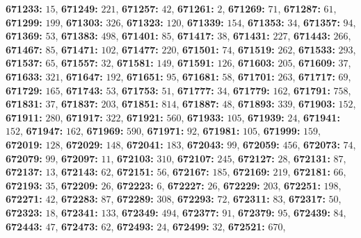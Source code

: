 \textsf{\bfseries 671233:} $15$, \textsf{\bfseries 671249:} $221$, \textsf{\bfseries 671257:} $42$, \textsf{\bfseries 671261:} $2$, \textsf{\bfseries 671269:} $71$, \textsf{\bfseries 671287:} $61$, \textsf{\bfseries 671299:} $199$, \textsf{\bfseries 671303:} $326$, \textsf{\bfseries 671323:} $120$, \textsf{\bfseries 671339:} $154$, \textsf{\bfseries 671353:} $34$, \textsf{\bfseries 671357:} $94$, \textsf{\bfseries 671369:} $53$, \textsf{\bfseries 671383:} $498$, \textsf{\bfseries 671401:} $85$, \textsf{\bfseries 671417:} $38$, \textsf{\bfseries 671431:} $227$, \textsf{\bfseries 671443:} $266$, \textsf{\bfseries 671467:} $85$, \textsf{\bfseries 671471:} $102$, \textsf{\bfseries 671477:} $220$, \textsf{\bfseries 671501:} $74$, \textsf{\bfseries 671519:} $262$, \textsf{\bfseries 671533:} $293$, \textsf{\bfseries 671537:} $65$, \textsf{\bfseries 671557:} $32$, \textsf{\bfseries 671581:} $149$, \textsf{\bfseries 671591:} $126$, \textsf{\bfseries 671603:} $205$, \textsf{\bfseries 671609:} $37$, \textsf{\bfseries 671633:} $321$, \textsf{\bfseries 671647:} $192$, \textsf{\bfseries 671651:} $95$, \textsf{\bfseries 671681:} $58$, \textsf{\bfseries 671701:} $263$, \textsf{\bfseries 671717:} $69$, \textsf{\bfseries 671729:} $165$, \textsf{\bfseries 671743:} $53$, \textsf{\bfseries 671753:} $51$, \textsf{\bfseries 671777:} $34$, \textsf{\bfseries 671779:} $162$, \textsf{\bfseries 671791:} $758$, \textsf{\bfseries 671831:} $37$, \textsf{\bfseries 671837:} $203$, \textsf{\bfseries 671851:} $814$, \textsf{\bfseries 671887:} $48$, \textsf{\bfseries 671893:} $339$, \textsf{\bfseries 671903:} $152$, \textsf{\bfseries 671911:} $280$, \textsf{\bfseries 671917:} $322$, \textsf{\bfseries 671921:} $560$, \textsf{\bfseries 671933:} $105$, \textsf{\bfseries 671939:} $24$, \textsf{\bfseries 671941:} $152$, \textsf{\bfseries 671947:} $162$, \textsf{\bfseries 671969:} $590$, \textsf{\bfseries 671971:} $92$, \textsf{\bfseries 671981:} $105$, \textsf{\bfseries 671999:} $159$, \textsf{\bfseries 672019:} $128$, \textsf{\bfseries 672029:} $148$, \textsf{\bfseries 672041:} $183$, \textsf{\bfseries 672043:} $99$, \textsf{\bfseries 672059:} $456$, \textsf{\bfseries 672073:} $74$, \textsf{\bfseries 672079:} $99$, \textsf{\bfseries 672097:} $11$, \textsf{\bfseries 672103:} $310$, \textsf{\bfseries 672107:} $245$, \textsf{\bfseries 672127:} $28$, \textsf{\bfseries 672131:} $87$, \textsf{\bfseries 672137:} $13$, \textsf{\bfseries 672143:} $62$, \textsf{\bfseries 672151:} $56$, \textsf{\bfseries 672167:} $185$, \textsf{\bfseries 672169:} $219$, \textsf{\bfseries 672181:} $66$, \textsf{\bfseries 672193:} $35$, \textsf{\bfseries 672209:} $26$, \textsf{\bfseries 672223:} $6$, \textsf{\bfseries 672227:} $26$, \textsf{\bfseries 672229:} $203$, \textsf{\bfseries 672251:} $198$, \textsf{\bfseries 672271:} $42$, \textsf{\bfseries 672283:} $87$, \textsf{\bfseries 672289:} $308$, \textsf{\bfseries 672293:} $72$, \textsf{\bfseries 672311:} $83$, \textsf{\bfseries 672317:} $50$, \textsf{\bfseries 672323:} $18$, \textsf{\bfseries 672341:} $133$, \textsf{\bfseries 672349:} $494$, \textsf{\bfseries 672377:} $91$, \textsf{\bfseries 672379:} $95$, \textsf{\bfseries 672439:} $84$, \textsf{\bfseries 672443:} $47$, \textsf{\bfseries 672473:} $62$, \textsf{\bfseries 672493:} $24$, \textsf{\bfseries 672499:} $32$, \textsf{\bfseries 672521:} $670$, 

